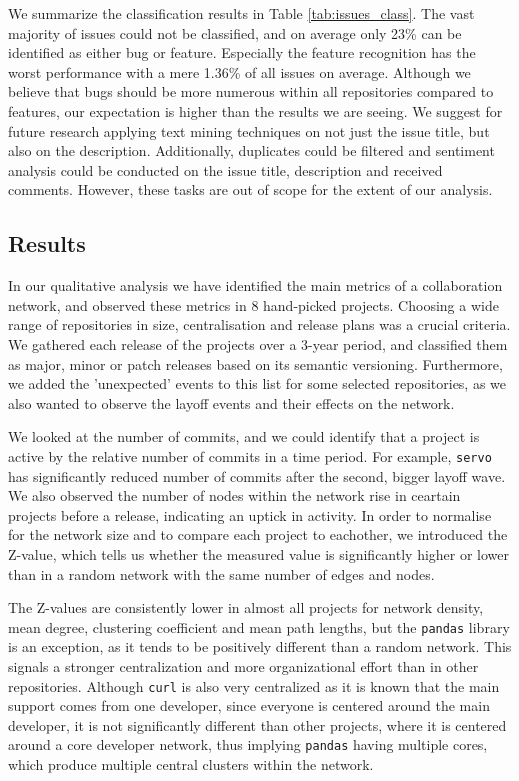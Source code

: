 We summarize the classification results in Table \ref{tab:issues_class}. The vast majority of issues could not be classified, and on average only 23\% can be identified as either bug or feature. Especially the feature recognition has the worst performance with a mere 1.36\% of all issues on average. Although we believe that bugs should be more numerous within all repositories compared to features, our expectation is higher than the results we are seeing. We suggest for future research applying text mining techniques on not just the issue title, but also on the description. Additionally, duplicates could be filtered and sentiment analysis could be conducted on the issue title, description and received comments. However, these tasks are out of scope for the extent of our analysis.

\subsection{Results}

In our qualitative analysis we have identified the main metrics of a collaboration network, and observed these metrics in 8 hand-picked projects. Choosing a wide range of repositories in size, centralisation and release plans was a crucial criteria. We gathered each release of the projects over a 3-year period, and classified them as major, minor or patch releases based on its semantic versioning. Furthermore, we added the 'unexpected' events to this list for some selected repositories, as we also wanted to observe the layoff events and their effects on the network.

We looked at the number of commits, and we could identify that a project is active by the relative number of commits in a time period. For example, \texttt{servo} has significantly reduced number of commits after the second, bigger layoff wave. We also observed the number of nodes within the network rise in ceartain projects before a release, indicating an uptick in activity. In order to normalise for the network size and to compare each project to eachother, we introduced the Z-value, which tells us whether the measured value is significantly higher or lower than in a random network with the same number of edges and nodes.

The Z-values are consistently lower in almost all projects for network density, mean degree, clustering coefficient and mean path lengths, but the \texttt{pandas} library is an exception, as it tends to be positively different than a random network. This signals a stronger centralization and more organizational effort than in other repositories. Although \texttt{curl} is also very centralized as it is known that the main support comes from one developer, since everyone is centered around the main developer, it is not significantly different than other projects, where it is centered around a core developer network, thus implying \texttt{pandas} having multiple cores, which produce multiple central clusters within the network.

